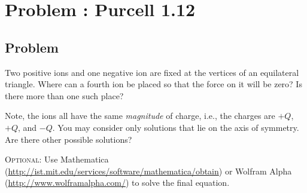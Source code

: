 \documentclass[solutions]{esg8022pset}
\begin{document}
\section{Problem \thesection: Purcell 1.12}
\subsection{Problem}
  Two positive ions and one negative ion are fixed at the vertices of an equilateral triangle.  Where can a fourth ion be placed so that the force on it will be zero?  Is there more than one such place?

  Note, the ions all have the same \emph{magnitude} of charge, i.e., the charges are $+Q$, $+Q$, and $-Q$. You may consider only solutions that lie on the axis of symmetry. Are there other possible solutions?

  \textsc{Optional}: Use Mathematica (\url{http://ist.mit.edu/services/software/mathematica/obtain}) or Wolfram Alpha (\url{http://www.wolframalpha.com/}) to solve the final equation.
\end{document}
